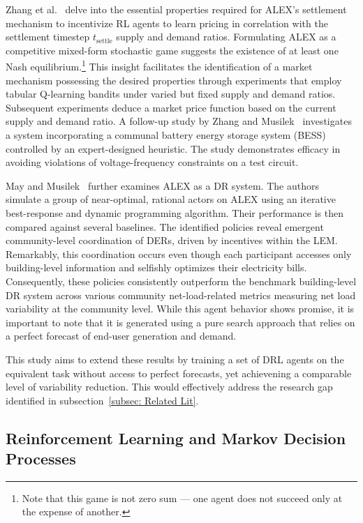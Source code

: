\documentclass[preprint, 12pt]{elsarticle}
\newcommand{\stl}{\text{settle}}
\begin{document}
Zhang et al.~\cite{ALEXV1} delve into the essential properties required for ALEX's settlement mechanism to incentivize RL agents to learn pricing in correlation with the settlement timestep $t_{\stl}$ supply and demand ratios. Formulating ALEX as a competitive mixed-form stochastic game suggests the existence of at least one Nash equilibrium.\footnote{Note that this game is not zero sum --- one agent does not succeed only at the expense of another.} This insight facilitates the identification of a market mechanism possessing the desired properties through experiments that employ tabular Q-learning bandits under varied but fixed supply and demand ratios. Subsequent experiments deduce a market price function based on the current supply and demand ratio. A follow-up study by Zhang and Musilek~\cite{Zhang_ALEX_MDPI} investigates a system incorporating a communal battery energy storage system (BESS) controlled by an expert-designed heuristic. The study demonstrates efficacy in avoiding violations of voltage-frequency constraints on a test circuit.

May and Musilek~\cite{ALEXV2} further examines ALEX as a DR system. The authors simulate a group of near-optimal, rational actors on ALEX using an iterative best-response and dynamic programming algorithm. Their performance is then compared against several baselines. The identified policies reveal emergent community-level coordination of DERs, driven by incentives within the LEM. Remarkably, this coordination occurs even though each participant accesses only building-level information and selfishly optimizes their electricity bills. Consequently, these policies consistently outperform the benchmark building-level DR system across various community net-load-related metrics measuring net load variability at the community level. While this agent behavior shows promise, it is important to note that it is generated using a pure search approach that relies on a perfect forecast of end-user generation and demand.

This study aims to extend these results by training a set of DRL agents on the equivalent task without access to perfect forecasts, yet achievening a comparable level of variability reduction. This would effectively address the research gap identified in subsection~\ref{subsec: Related Lit}.

\subsection{Reinforcement Learning and Markov Decision Processes}\label{subsec: DRL}
\end{document}
